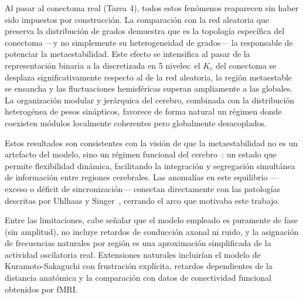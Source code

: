 \documentclass[
  reprint,
  amsmath,amssymb,
  aps,
  pra,
]{revtex4-2}
\begin{document}
Al pasar al conectoma real (Tarea 4), todos estos fenómenos reaparecen sin haber sido impuestos por construcción. La comparación con la red aleatoria que preserva la distribución de grados demuestra que es la topología específica del conectoma ---y no simplemente su heterogeneidad de grados--- la responsable de potenciar la metaestabilidad. Este efecto se intensifica al pasar de la representación binaria a la discretizada en 5 niveles: el $K_c$ del conectoma se desplaza significativamente respecto al de la red aleatoria, la región metaestable se ensancha y las fluctuaciones hemisféricas superan ampliamente a las globales. La organización modular y jerárquica del cerebro, combinada con la distribución heterogénea de pesos sinápticos, favorece de forma natural un régimen donde coexisten módulos localmente coherentes pero globalmente desacoplados.

Estos resultados son consistentes con la visión de que la metaestabilidad no es un artefacto del modelo, sino un régimen funcional del cerebro~\cite{cabral2011role,villegas2014frustrated}: un estado que permite flexibilidad dinámica, facilitando la integración y segregación simultánea de información entre regiones cerebrales. Las anomalías en este equilibrio ---exceso o déficit de sincronización--- conectan directamente con las patologías descritas por Uhlhaas y Singer~\cite{uhlhaas2006neural}, cerrando el arco que motivaba este trabajo.

Entre las limitaciones, cabe señalar que el modelo empleado es puramente de fase (sin amplitud), no incluye retardos de conducción axonal ni ruido, y la asignación de frecuencias naturales por región es una aproximación simplificada de la actividad oscilatoria real. Extensiones naturales incluirían el modelo de Kuramoto-Sakaguchi con frustración explícita, retardos dependientes de la distancia anatómica y la comparación con datos de conectividad funcional obtenidos por fMRI.



\end{document}
